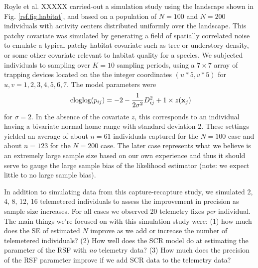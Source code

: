 Royle et al. XXXXX 
 carried-out a simulation study using the landscape shown in
Fig. \ref{rsf.fig.habitat}, and based on a population of $N=100$ and $N=200$
individuals with activity centers distributed uniformly over the
landscape.  This patchy covariate was simulated by generating a field
of spatially correlated noise to emulate a typical patchy habitat
covariate such as tree or understory density, or some other covariate
relevant to habitat quality for a species.  We subjected individuals
to sampling over $K=10$ sampling periods, using a $7 \times 7$ array
of trapping devices located on the the integer coordinates $(u*5,v*5)$
for $u,v = 1,2,3,4,5,6,7$. The model parameters were
\[
\mbox{ cloglog}(p_{ij}) = -2  -\frac{1}{2\sigma^{2}} D_{ij}^{2} + 1 \times z({\bf x}_{j})
\]
for $\sigma =2$. In the absence of the covariate $z$, this corresponds
to an individual having a bivariate normal home range with standard
deviation 2.
These settings yielded an average of about $n=61$ individuals captured for
the $N=100$ case and about $n=123$ for the $N=200$ case. The later case
represents what we believe is an extremely large sample size based on
our own experience and thus it should serve to gauge the large sample
bias of the likelihood estimator (note: we expect little to no large
sample bias).

In addition to simulating data from this capture-recapture study, we
simulated 2, 4, 8, 12, 16 telemetered individuals to assess the
improvement in precision as sample size increases.  For all cases we
observed 20 telemetry fixes {\it per} individual.  The main things
we're focused on with this simulation study were: (1) how much does
the SE of estimated $N$ improve as we add or increase the number of
telemetered individuals?  (2) How well does the SCR model do at
estimating the parameter of the RSF with {\it no} telemetry data?  (3)
How much does the precision of the RSF parameter improve if we add SCR
data to the telemetry data?



